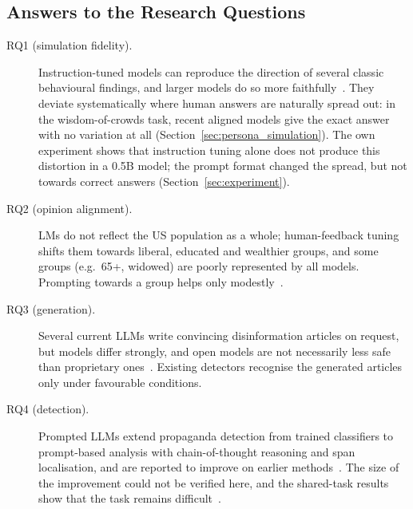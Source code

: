 \subsection{Answers to the Research Questions}
\begin{description}
    \item[RQ1 (simulation fidelity).] Instruction-tuned models can reproduce the direction of several classic behavioural findings, and larger models do so more faithfully~\cite{aher2023using}. They deviate systematically where human answers are naturally spread out: in the wisdom-of-crowds task, recent aligned models give the exact answer with no variation at all (Section~\ref{sec:persona_simulation}). The own experiment shows that instruction tuning alone does not produce this distortion in a 0.5B model; the prompt format changed the spread, but not towards correct answers (Section~\ref{sec:experiment}).
    \item[RQ2 (opinion alignment).] LMs do not reflect the US population as a whole; human-feedback tuning shifts them towards liberal, educated and wealthier groups, and some groups (e.g.\ 65+, widowed) are poorly represented by all models. Prompting towards a group helps only modestly~\cite{santurkar2023whose}.
    \item[RQ3 (generation).] Several current LLMs write convincing disinformation articles on request, but models differ strongly, and open models are not necessarily less safe than proprietary ones~\cite{vykopal2024disinformation}. Existing detectors recognise the generated articles only under favourable conditions.
    \item[RQ4 (detection).] Prompted LLMs extend propaganda detection from trained classifiers to prompt-based analysis with chain-of-thought reasoning and span localisation, and are reported to improve on earlier methods~\cite{gaeta2025towards}. The size of the improvement could not be verified here, and the shared-task results show that the task remains difficult~\cite{dasanmartino2020semeval}.
\end{description}

